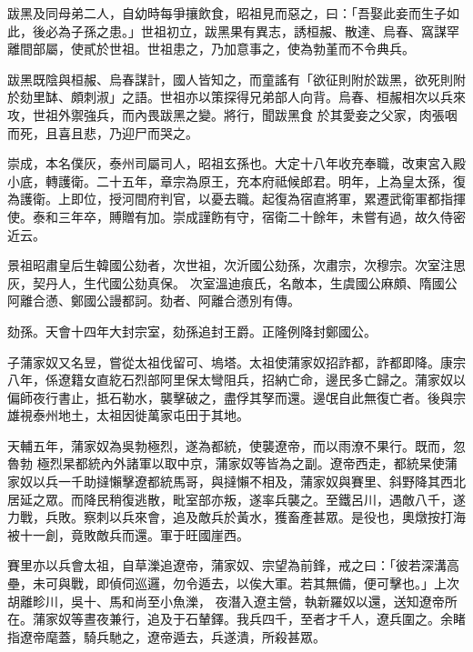 \begin{pinyinscope}
 跋黑及同母弟二人，自幼時每爭攘飲食，昭祖見而惡之，曰：「吾娶此妾而生子如此，後必為子孫之患。」世祖初立，跋黑果有異志，誘桓赧、散達、烏春、窩謀罕離間部屬，使貳於世祖。世祖患之，乃加意事之，使為勃堇而不令典兵。



 跋黑既陰與桓赧、烏春謀計，國人皆知之，而童謠有「欲征則附於跋黑，欲死則附於劾里缽、頗刺淑」之語。世祖亦以策探得兄弟部人向背。烏春、桓赧相次以兵來攻，世祖外禦強兵，而內畏跋黑之變。將行，聞跋黑食
 於其愛妾之父家，肉張咽而死，且喜且悲，乃迎尸而哭之。



 崇成，本名僕灰，泰州司屬司人，昭祖玄孫也。大定十八年收充奉職，改東宮入殿小底，轉護衛。二十五年，章宗為原王，充本府祗候郎君。明年，上為皇太孫，復為護衛。上即位，授河間府判官，以憂去職。起復為宿直將軍，累遷武衛軍都指揮使。泰和三年卒，賻贈有加。崇成謹飭有守，宿衛二十餘年，未嘗有過，故久侍密近云。



 景祖昭肅皇后生韓國公劾者，次世祖，次沂國公劾孫，次肅宗，次穆宗。次室注思灰，契丹人，生代國公劾真保。
 次室溫迪痕氏，名敵本，生虞國公麻頗、隋國公阿離合懣、鄭國公謾都訶。劾者、阿離合懣別有傳。



 劾孫。天會十四年大封宗室，劾孫追封王爵。正隆例降封鄭國公。



 子蒲家奴又名昱，嘗從太祖伐留可、塢塔。太祖使蒲家奴招詐都，詐都即降。康宗八年，係遼籍女直紇石烈部阿里保太彎阻兵，招納亡命，邊民多亡歸之。蒲家奴以偏師夜行書止，抵石勒水，襲擊破之，盡俘其孥而還。邊氓自此無復亡者。後與宗雄視泰州地土，太祖因徙萬家屯田于其地。



 天輔五年，蒲家奴為吳勃極烈，遂為都統，使襲遼帝，而以雨潦不果行。既而，忽魯勃
 極烈杲都統內外諸軍以取中京，蒲家奴等皆為之副。遼帝西走，都統杲使蒲家奴以兵一千助撻懶擊遼都統馬哥，與撻懶不相及，蒲家奴與賽里、斜野降其西北居延之眾。而降民稍復逃散，毗室部亦叛，遂率兵襲之。至鐵呂川，遇敵八千，遂力戰，兵敗。察刺以兵來會，追及敵兵於黃水，獲畜產甚眾。是役也，奧燉按打海被十一創，竟敗敵兵而還。軍于旺國崖西。



 賽里亦以兵會太祖，自草濼追遼帝，蒲家奴、宗望為前鋒，戒之曰：「彼若深溝高壘，未可與戰，即偵伺巡邏，勿令遁去，以俟大軍。若其無備，便可擊也。」上次胡離畛川，吳十、馬和尚至小魚濼，
 夜潛入遼主營，執新羅奴以還，送知遼帝所在。蒲家奴等晝夜兼行，追及于石輦鐸。我兵四千，至者才千人，遼兵圍之。余睹指遼帝麾蓋，騎兵馳之，遼帝遁去，兵遂潰，所殺甚眾。




\end{pinyinscope}
